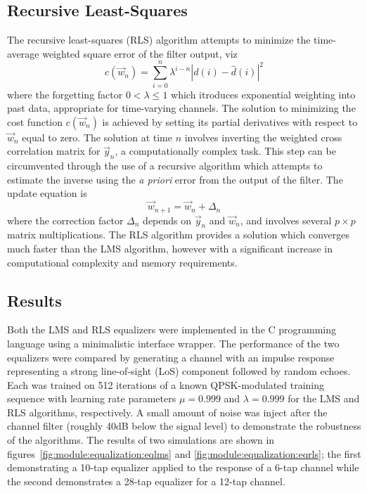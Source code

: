 \subsection{Recursive Least-Squares}
The recursive least-squares (RLS) algorithm attempts to minimize the
time-average weighted square error of the filter output, viz
\begin{equation}
c(\vec{w}_n) = \sum\limits_{i=0}^{n}{ \lambda^{i-n} \left| d(i)-\hat{d}(i)\right|^2 }
\end{equation}
where the forgetting factor $0<\lambda\leq 1$ which itroduces exponential
weighting into past data, appropriate for time-varying channels.
The solution to minimizing the cost function $c(\vec{w}_n)$ is achieved by
setting its partial derivatives with respect to $\vec{w}_n$ equal to zero.
The solution at time $n$ involves inverting the weighted cross correlation
matrix for $\vec{y}_n$, a computationally complex task.
This step can be circumvented through the use of a recursive algorithm which
attempts to estimate the inverse using the {\it a priori} error from the
output of the filter.
The update equation is
\begin{equation}
\label{eq:rls:weight_update}
\vec{w}_{n+1} = \vec{w}_n + \Delta_{n}
\end{equation}
where the correction factor $\Delta_{n}$ depends on $\vec{y}_n$ and $\vec{w}_n$,
and involves several $p \times p$ matrix multiplications.
The RLS algorithm provides a solution which converges much faster than the LMS
algorithm, however with a significant increase in computational complexity and
memory requirements.

\subsection{Results}
Both the LMS and RLS equalizers were implemented in the C programming
language using a minimalistic interface wrapper.
The performance of the two equalizers were compared by generating a channel
with an impulse response representing a strong line-of-sight (LoS) component
followed by random echoes.
Each was trained on 512 iterations of a known QPSK-modulated training sequence with learning
rate parameters $\mu=0.999$ and $\lambda=0.999$ for the LMS and RLS algorithms,
respectively.
A small amount of noise was inject after the channel filter (roughly 40dB
below the signal level) to demonstrate the robustness of the algorithms.
The results of two simulations are shown in
figures~\ref{fig:module:equalization:eqlms} and \ref{fig:module:equalization:eqrls};
the first demonstrating a 10-tap equalizer applied to the response of a 6-tap
channel while the second demonstrates a 28-tap equalizer for a 12-tap
channel.


